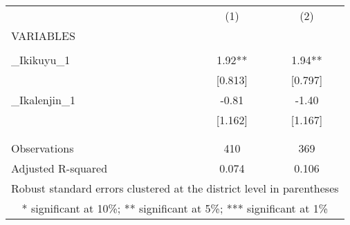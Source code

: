 \begin{tabular}{lcc} \hline
 & (1) & (2) \\
VARIABLES &  &  \\ \hline
 &  &  \\
\_Ikikuyu\_1 & 1.92** & 1.94** \\
 & [0.813] & [0.797] \\
\_Ikalenjin\_1 & -0.81 & -1.40 \\
 & [1.162] & [1.167] \\
 &  &  \\
 &  &  \\
Observations & 410 & 369 \\
 Adjusted R-squared & 0.074 & 0.106 \\ \hline
\multicolumn{3}{c}{ Robust standard errors clustered at the district level in parentheses} \\
\multicolumn{3}{c}{ * significant at 10\%; ** significant at 5\%; *** significant at 1\%} \\
\end{tabular}
